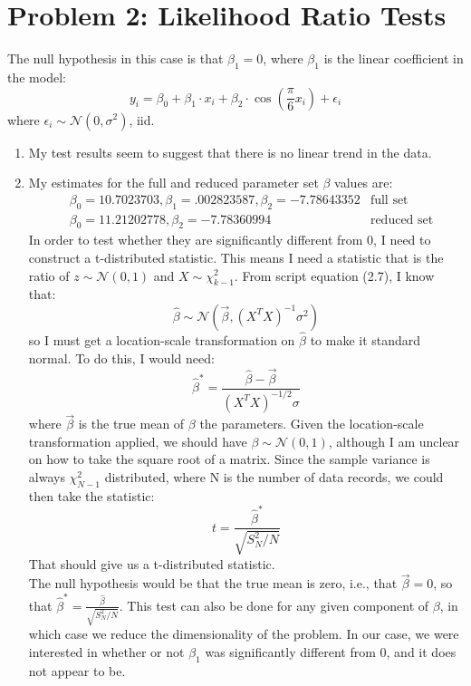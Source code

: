 \documentclass[a4paper,12pt]{article}
\newcommand{\sN}{\mathcal{N}}
\begin{document}
\section{Problem 2: Likelihood Ratio Tests}
The null hypothesis in this case is that $\beta_{1} = 0$, where $\beta_{1}$ is the linear coefficient in the model:
\begin{equation}
y_{i} = \beta_{0} + \beta_{1}\cdot x_{i} + \beta_{2}\cdot \cos\left( \frac{\pi}{6} x_{i} \right) + \epsilon_{i}
\end{equation}
where $\epsilon_{i}\sim \sN(0,\sigma^{2})$, iid. 
\begin{enumerate}
\item My test results seem to suggest that there is no linear trend in the data.
\item My estimates for the full and reduced parameter set $\beta$ values are:
\begin{align*}
&\beta_{0} = 10.7023703, \beta_{1} = .002823587, \beta_{2} = -7.78643352 &\text{full set} \\
&\beta_{0} = 11.21202778, \beta_{2} = -7.78360994 & \text{reduced set}
\end{align*}
In order to test whether they are significantly different from 0, I need to construct a t-distributed statistic. This means I need a statistic that is the ratio of $z \sim \sN (0,1)$ and $X\sim \chi_{k-1}^{2}$. From script equation (2.7), I know that:
\begin{equation}
\hat{\beta} \sim \sN(\vec{\beta}, (X^{T}X)^{-1}\sigma^{2})
\end{equation}
so I must get a location-scale transformation on $\hat{\beta}$ to make it standard normal. To do this, I would need:
\begin{equation}
\hat{\beta}^{*} = \frac{\hat{\beta} - \vec{\beta}}{(X^{T}X)^{-1/2}\sigma}
\end{equation}
where $\vec{\beta}$ is the true mean of $\beta$ the parameters. Given the location-scale transformation applied, we should have $\beta\sim\sN(0,1)$, although I am unclear on how to take the square root of a matrix. Since the sample variance is always $\chi_{N-1}^{2}$ distributed, where N is the number of data records, we could then take the statistic:
\begin{equation}
t = \frac{\hat{\beta}^{*}}{\sqrt{S_{N}^{2}/N}}
\end{equation}
That should give us a t-distributed statistic. \\
The null hypothesis would be that the true mean is zero, i.e., that $\vec{\beta} = 0$, so that $\hat{\beta}^{*} = \frac{\hat{\beta}}{\sqrt{S_{N}^{2}/N}}$. This test can also be done for any given component of $\beta$, in which case we reduce the dimensionality of the problem. In our case, we were interested in whether or not $\beta_{1}$ was significantly different from 0, and it does not appear to be. 


\end{enumerate}
\end{document}
